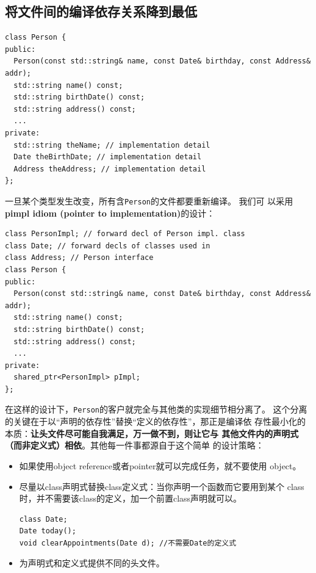 \subsection{将文件间的编译依存关系降到最低}
\label{sec:Item-31}
\begin{verbatim}
class Person {
public:
  Person(const std::string& name, const Date& birthday, const Address& addr);
  std::string name() const;
  std::string birthDate() const;
  std::string address() const;
  ...
private:
  std::string theName; // implementation detail
  Date theBirthDate; // implementation detail
  Address theAddress; // implementation detail
};
\end{verbatim}
一旦某个类型发生改变，所有含\texttt{Person}的文件都要重新编译。 我们可
以采用\textbf{pimpl idiom (pointer to implementation)}的设计：
\begin{verbatim}
class PersonImpl; // forward decl of Person impl. class
class Date; // forward decls of classes used in
class Address; // Person interface
class Person {
public:
  Person(const std::string& name, const Date& birthday, const Address& addr);
  std::string name() const;
  std::string birthDate() const;
  std::string address() const;
  ...
private:
  shared_ptr<PersonImpl> pImpl;
};
\end{verbatim}
在这样的设计下，\texttt{Person}的客户就完全与其他类的实现细节相分离了。
这个分离的关键在于以“声明的依存性”替换“定义的依存性”，那正是编译依
存性最小化的本质：\textbf{让头文件尽可能自我满足，万一做不到，则让它与
  其他文件内的声明式（而非定义式）相依}。其他每一件事都源自于这个简单
的设计策略：
\begin{itemize}
\item 如果使用object reference或者pointer就可以完成任务，就不要使用
  object。
\item 尽量以class声明式替换class定义式：当你声明一个函数而它要用到某个
  class时，并不需要该class的定义，加一个前置class声明就可以。
\begin{verbatim}
class Date;
Date today();
void clearAppointments(Date d); //不需要Date的定义式
\end{verbatim}
\item 为声明式和定义式提供不同的头文件。
\end{itemize}


